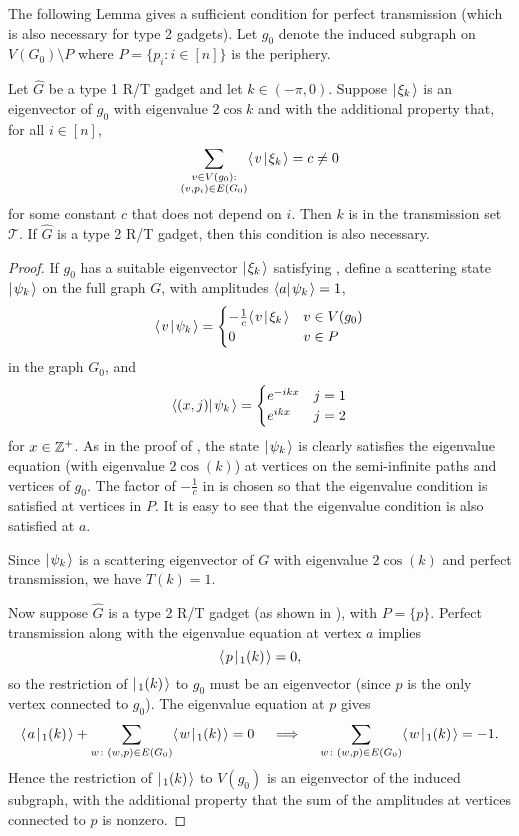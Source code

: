 \documentclass[../thesis-main/thesis-main]{subfiles}
\begin{document}
The following Lemma gives a sufficient condition for perfect transmission (which is also necessary for type 2 gadgets).  Let $g_0$ denote the induced subgraph on $V(G_0)\setminus P$ where $P = \{p_i\colon i\in [n]\}$ is the periphery.

\begin{lemma}\label{lem:transmit_reqs}
Let $\hat{G}$ be a type 1 R/T gadget and let $k\in (-\pi,0)$. Suppose $|\mspace{2mu} \xi_k \mspace{2mu} \rangle$ is an eigenvector of $g_0$ with eigenvalue $2\cos{k}$ and with the additional property that, for all $i \in [n]$,
\begin{equation}
\label{eq:trans_cond}
  \sum_{\substack{v \in V(g_0): \\ (v,p_i)\in E(G_0)}} \langle\mspace{2mu} v \mspace{2mu} | \mspace{2mu} \xi_k\mspace{2mu} \rangle = c \neq 0 
\end{equation}
for some constant $c$ that does not depend on $i$. Then $k$ is in the transmission set $\mathcal{T}$. If $\hat{G}$ is a type 2 R/T gadget, then this condition is also necessary.
\end{lemma}

\begin{proof}
If $g_0$ has a suitable eigenvector $|\mspace{2mu} \xi_k \mspace{2mu} \rangle$ satisfying , define a scattering state $|\mspace{2mu} \psi_k \mspace{2mu} \rangle$ on the full graph $G$, with amplitudes $\langle a|\mspace{2mu} \psi_k \mspace{2mu} \rangle=1$, 
\begin{equation}
  \langle\mspace{2mu} v \mspace{2mu} | \mspace{2mu} \psi_k\mspace{2mu} \rangle 
  = \begin{cases} -\frac{1}{c} \langle\mspace{2mu} v \mspace{2mu} | \mspace{2mu} \xi_k\mspace{2mu} \rangle & v\in V(g_0)\\
  	0 & v \in P
\end{cases}
\label{eq:psik_c}
\end{equation}
in the graph $G_0$, and 
\[
 \langle{(x,j)} |\mspace{2mu} \psi_k \mspace{2mu} \rangle=\begin{cases} e^{-ikx} & j=1\\
 e^{ikx} & j=2
\end{cases}
\]
for $x \in \mathbb{Z}^+$.  As in the proof of , the state $|\mspace{2mu} \psi_k \mspace{2mu} \rangle$ is clearly satisfies the eigenvalue equation (with eigenvalue $2\cos(k)$) at vertices on the semi-infinite paths and vertices of $g_0$.  The factor of $-\frac{1}{c}$ in  is chosen so that the eigenvalue condition is satisfied at vertices in $P$.  It is easy to see that the eigenvalue condition is also satisfied at $a$.

Since $|\mspace{2mu} \psi_k \mspace{2mu} \rangle$ is a scattering eigenvector of $G$ with eigenvalue $2\cos(k)$ and perfect transmission, we have $T(k)=1$.

Now suppose $\hat{G}$ is a type 2 R/T gadget (as shown in ), with $P = \{p\}$.  Perfect transmission along with the eigenvalue equation at vertex $a$ implies
\[
\langle\mspace{2mu} p \mspace{2mu} | \mspace{2mu} \sc_1(k)\mspace{2mu} \rangle = 0,
\]
so the restriction of $|\mspace{2mu} \sc_1(k) \mspace{2mu} \rangle$ to $g_0$ must be an eigenvector (since $p$ is the only vertex connected to $g_0$).  The eigenvalue equation at $p$ gives
\[
  \langle\mspace{2mu} a \mspace{2mu} | \mspace{2mu} \sc_1(k)\mspace{2mu} \rangle 
  + \sum_{w \colon (w,p)\in E(G_0)} \langle\mspace{2mu} w \mspace{2mu} | \mspace{2mu} \sc_1(k)\mspace{2mu} \rangle = 0 
  \quad\implies\quad
  \sum_{w \colon (w,p)\in E(G_0)} \langle\mspace{2mu} w \mspace{2mu} | \mspace{2mu} \sc_1(k)\mspace{2mu} \rangle = -1.
\]
Hence the restriction of $|\mspace{2mu} \sc_1(k) \mspace{2mu} \rangle$ to $V(g_0)$ is an eigenvector of the induced subgraph, with the additional property that the sum of the amplitudes at vertices connected to $p$ is nonzero.
\end{proof}
\end{document}
